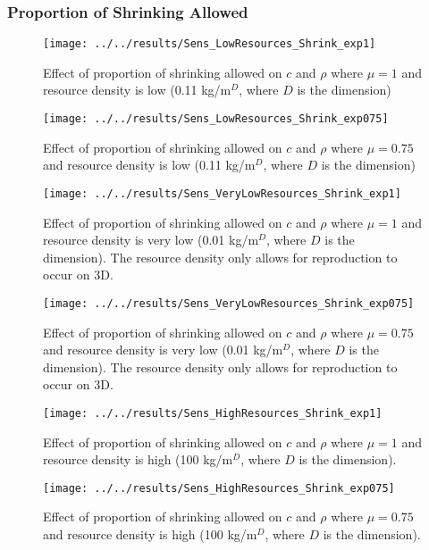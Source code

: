 \subsubsection{Proportion of Shrinking Allowed}

\begin{figure}[h]
	\centering
	\texttt{[image: ../../results/Sens\_LowResources\_Shrink\_exp1]}
	\caption{Effect of proportion of shrinking allowed on $c$ and $\rho$ where $\mu = 1$ and resource density is low (0.11 kg/m$^D$, where $D$ is the dimension)}
	\label{fig:senslowresourcesshrinkexp1}
\end{figure}
\begin{figure}
	\centering
	\texttt{[image: ../../results/Sens\_LowResources\_Shrink\_exp075]}
	\caption{Effect of proportion of shrinking allowed on $c$ and $\rho$ where $\mu = 0.75$ and resource density is low (0.11 kg/m$^D$, where $D$ is the dimension)}
	\label{fig:senslowresourcesshrinkexp075}
\end{figure}
\begin{figure}
	\centering
	\texttt{[image: ../../results/Sens\_VeryLowResources\_Shrink\_exp1]}
	\caption{Effect of proportion of shrinking allowed on $c$ and $\rho$ where $\mu = 1$ and resource density is very low (0.01 kg/m$^D$, where $D$ is the dimension).  The resource density only allows for reproduction to occur on 3D.}
	\label{fig:sensverylowresourcesshrinkexp1}
\end{figure}
\begin{figure}
	\centering
	\texttt{[image: ../../results/Sens\_VeryLowResources\_Shrink\_exp075]}
	\caption{Effect of proportion of shrinking allowed on $c$ and $\rho$ where $\mu = 0.75$ and resource density is very low (0.01 kg/m$^D$, where $D$ is the dimension).  The resource density only allows for reproduction to occur on 3D.}
	\label{fig:sensverylowresourcesshrinkexp075}
\end{figure}
\begin{figure}
	\centering
	\texttt{[image: ../../results/Sens\_HighResources\_Shrink\_exp1]}
	\caption{Effect of proportion of shrinking allowed on $c$ and $\rho$ where $\mu = 1$ and resource density is high (100 kg/m$^D$, where $D$ is the dimension).}
	\label{fig:senshighresourcesshrinkexp1}
\end{figure}
\begin{figure}
	\centering
	\texttt{[image: ../../results/Sens\_HighResources\_Shrink\_exp075]}
	\caption{Effect of proportion of shrinking allowed on $c$ and $\rho$ where $\mu = 0.75$ and resource density is high (100 kg/m$^D$, where $D$ is the dimension).}
	\label{fig:senshighresourcesshrinkexp075}
\end{figure}
